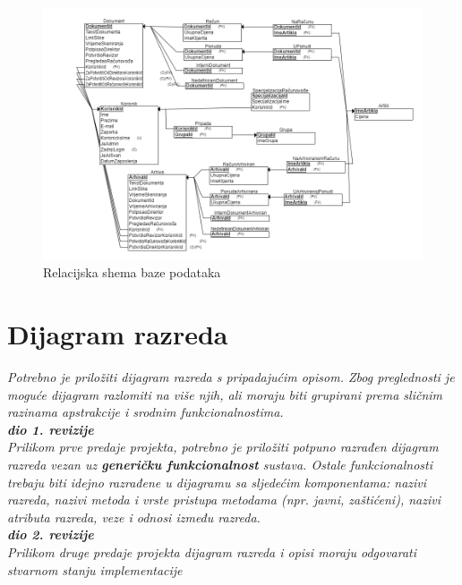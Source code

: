			\begin{figure}[H]
				\includegraphics[width=\textwidth]{slike/Relacijska_shema.png} %
				\caption{Relacijska shema baze podataka}
				\label{fig:relacijska_shema} %
			\end{figure}

			\eject
			
			
		\section{Dijagram razreda}
		
			\textit{Potrebno je priložiti dijagram razreda s pripadajućim opisom. Zbog preglednosti je moguće dijagram razlomiti na više njih, ali moraju biti grupirani prema sličnim razinama apstrakcije i srodnim funkcionalnostima.}\\
			
			\textbf{\textit{dio 1. revizije}}\\
			
			\textit{Prilikom prve predaje projekta, potrebno je priložiti potpuno razrađen dijagram razreda vezan uz \textbf{generičku funkcionalnost} sustava. Ostale funkcionalnosti trebaju biti idejno razrađene u dijagramu sa sljedećim komponentama: nazivi razreda, nazivi metoda i vrste pristupa metodama (npr. javni, zaštićeni), nazivi atributa razreda, veze i odnosi između razreda.}\\
			
			\textbf{\textit{dio 2. revizije}}\\			
			
			\textit{Prilikom druge predaje projekta dijagram razreda i opisi moraju odgovarati stvarnom stanju implementacije}
			
